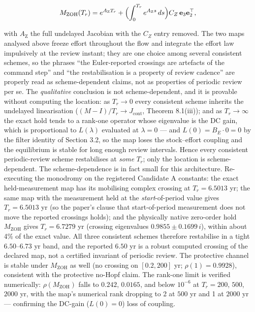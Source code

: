 \documentclass[11pt]{article}
\begin{document}
\[M_{\mathrm{ZOH}}(T_r) = e^{A_{\mathrm{Z}} T_r} + \Bigl( \int_0^{T_r} e^{A_{\mathrm{Z}} s}\, ds \Bigr) C_Z\, \mathbf e_3 \mathbf e_2^\top,\]

with \(A_{\mathrm{Z}}\) the full undelayed Jacobian with the \(C_Z\)
entry removed. The two maps analysed above freeze effort throughout the
flow and integrate the effort law impulsively at the review instant;
they are one choice among several consistent schemes, so the phrases
``the Euler-reported crossings are artefacts of the command step'' and
``the restabilisation is a property of review cadence'' are properly
read as scheme-dependent claims, not as properties of periodic review
per se. The \emph{qualitative} conclusion is not scheme-dependent, and
it is provable without computing the location: as \(T_r \to 0\) every
consistent scheme inherits the undelayed linearisation
(\((M - I)/T_r \to J_{\mathrm{cont}}\), Theorem 8.1(iii)); and as
\(T_r \to \infty\) the exact hold tends to a rank-one operator whose
eigenvalue is the DC gain, which is proportional to \(L(\lambda)\)
evaluated at \(\lambda = 0\) --- and \(L(0) = B_E \cdot 0 = 0\) by the
filter identity of Section 3.2, so the map loses the stock--effort
coupling and the equilibrium is stable for long enough review intervals.
Hence every consistent periodic-review scheme restabilises at
\emph{some} \(T_r\); only the location is scheme-dependent. The
scheme-dependence is in fact small for this architecture. Re-executing
the monodromy on the registered Candidate A constants: the exact
held-measurement map has its mobilising complex crossing at
\(T_r = 6.5013\) yr; the same map with the measurement held at the
\emph{start}-of-period value gives \(T_r = 6.5013\) yr (so the paper's
clause that start-of-period measurement does not move the reported
crossings holds); and the physically native zero-order hold
\(M_{\mathrm{ZOH}}\) gives \(T_r = 6.7279\) yr (crossing eigenvalues
\(0.9855 \pm 0.1699\,i\)), within about 4\% of the exact value. All
three consistent schemes therefore restabilise in a tight
\(6.50\)--\(6.73\) yr band, and the reported \(6.50\) yr is a robust
computed crossing of the declared map, not a certified invariant of
periodic review. The protective channel is stable under
\(M_{\mathrm{ZOH}}\) as well (no crossing on \([0.2, 200]\) yr;
\(\rho(1) = 0.9928\)), consistent with the protective no-Hopf claim. The
rank-one limit is verified numerically: \(\rho(M_{\mathrm{ZOH}})\) falls
to \(0.242\), \(0.0165\), and below \(10^{-6}\) at \(T_r = 200\),
\(500\), \(2000\) yr, with the map's numerical rank dropping to 2 at
\(500\) yr and 1 at \(2000\) yr --- confirming the DC-gain
(\(L(0) = 0\)) loss of coupling.
\end{document}
